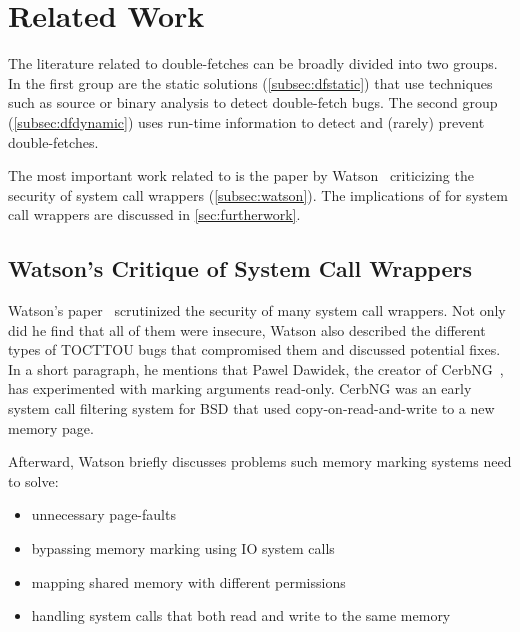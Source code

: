 \section{Related Work}
\label{sec:relatedwork}

The literature related to double-fetches can be broadly divided into two groups.
In the first group are the static solutions (\autoref{subsec:dfstatic}) that use
techniques such as source or binary analysis to detect double-fetch bugs. The
second group (\autoref{subsec:dfdynamic}) uses run-time information to detect
and (rarely) prevent double-fetches.

The most important work related to \sysname is the paper by
Watson~\cite{watson2007exploiting} criticizing the security of system call
wrappers (\autoref{subsec:watson}). The implications of \sysname for system call
wrappers are discussed in \autoref{sec:furtherwork}.

\subsection{Watson's Critique of System Call Wrappers}
\label{subsec:watson}
Watson's paper~\cite{watson2007exploiting} scrutinized the security of many
system call wrappers. Not only did he find that all of them were insecure,
Watson also described the different types of TOCTTOU bugs that compromised them
and discussed potential fixes. In a short paragraph, he mentions that Pawel
Dawidek, the creator of CerbNG~\cite{zak_frasunek_dawidek}, has experimented
with marking arguments read-only. CerbNG was an early system call filtering
system for BSD that used copy-on-read-and-write to a new memory page.

Afterward, Watson briefly discusses problems such memory marking systems
need to solve: 
\begin{itemize}
    \item unnecessary page-faults
    \item bypassing memory marking using IO system calls
    \item mapping shared memory with different permissions
    \item handling system calls that both read and write to the same memory
\end{itemize}


